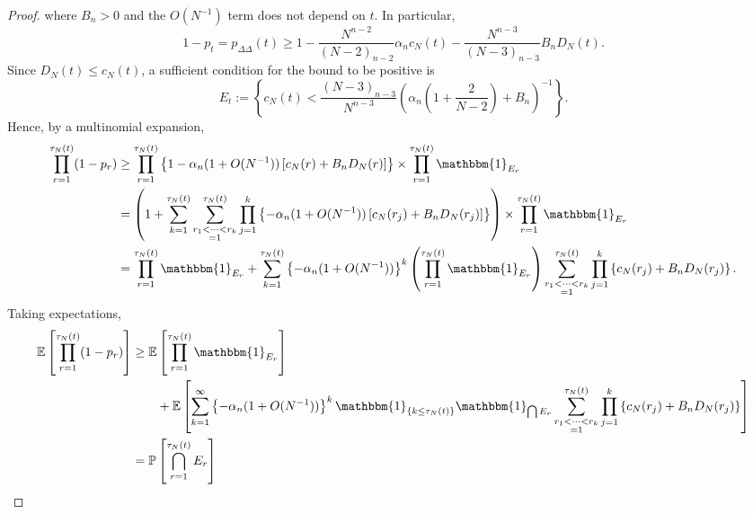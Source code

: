 \documentclass{article}
\newcommand{\Prob}{\mathbb{P}}
\newcommand{\E}{\mathbb{E}}
\newcommand{\I}[1]{\mathbbm{1}_{\{#1\}}}
\newcommand{\1}[1]{\mathbbm{1}_{#1}}
\begin{document}
\begin{proof}
where $B_n >0$ and the $O(N^{-1})$ term does not depend on $t$.
In particular,
\begin{equation}
1-p_t = p_{\Delta\Delta}(t) \geq 1 - \frac{N^{n-2}}{(N-2)_{n-2}} \alpha_n c_N(t) - \frac{N^{n-3}}{(N-3)_{n-3}} B_n D_N(t) .
\end{equation}
Since $D_N(t) \leq c_N(t)$, a sufficient condition for the bound to be positive is
\begin{equation}
E_t := \left\{ c_N(t) < \frac{(N-3)_{n-3}}{N^{n-3}} \left( \alpha_n \left(1 + \frac{2}{N-2} \right) + B_n \right)^{-1} \right\} .
\end{equation}
Hence, by a multinomial expansion,
\begin{align}
\prod_{r=1}^{\tau_N(t)} (1-p_r)
&\geq \prod_{r=1}^{\tau_N(t)} \left\{ 1 - \alpha_n (1+O(N^{-1}))\left[ c_N(r) + B_n D_N(r) \right] \right\}
\times \prod_{r=1}^{\tau_N(t)} \1{E_r} \notag\\
&= \left( 1 + \sum_{k=1}^{\tau_N(t)} \sum_{\substack{r_1<\dots<r_k \\ =1}}^{\tau_N(t)}\prod_{j=1}^k 
\left\{ - \alpha_n (1+O(N^{-1})) \left[ c_N(r_j) + B_n D_N(r_j) \right] \right\} \right)
\times \prod_{r=1}^{\tau_N(t)} \1{E_r} \notag\\
&= \prod_{r=1}^{\tau_N(t)} \1{E_r} 
+ \sum_{k=1}^{\tau_N(t)} \left\{- \alpha_n (1+O(N^{-1}))\right\}^k 
\left(\prod_{r=1}^{\tau_N(t)} \1{E_r} \right)
\sum_{\substack{r_1<\dots<r_k \\ =1}}^{\tau_N(t)}\prod_{j=1}^k 
\left\{ c_N(r_j) + B_n D_N(r_j) \right\} .
\end{align}
Taking expectations,
\begin{align}\label{eq:9}
\E \left[ \prod_{r=1}^{\tau_N(t)} (1-p_r) \right]
&\geq \E\left[ \prod_{r=1}^{\tau_N(t)} \1{E_r} \right] \notag\\
&\qquad + \E \left[ \sum_{k=1}^{\infty} \left\{- \alpha_n (1+O(N^{-1}))\right\}^k \I{k \leq \tau_N(t)} \1{\bigcap E_r} \sum_{\substack{r_1<\dots<r_k \\ =1}}^{\tau_N(t)}\prod_{j=1}^k 
\left\{ c_N(r_j) + B_n D_N(r_j) \right\} \right] \notag\\
&= \Prob \left[ \bigcap_{r=1}^{\tau_N(t)} E_r \right] \notag\\

\end{align}
\end{proof}
\end{document}
